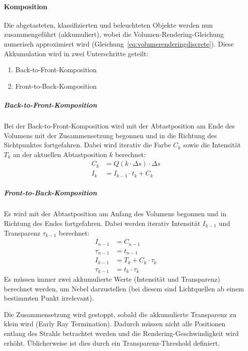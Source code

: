 				\paragraph{Komposition}
					Die abgetasteten, klassifizierten und beleuchteten Objekte werden nun zusammengeführt (akkumuliert), wobei die Volumen-Rendering-Gleichung numerisch approximiert wird (Gleichung~\eqref{eq:volumerenderingdiscrete}). Diese Akkumulation wird in zwei Unterschritte geteilt:
					\begin{enumerate}
						\item Back-to-Front-Komposition
						\item Front-to-Back-Komposition
					\end{enumerate}

					\subparagraph{Back-to-Front-Komposition}
						Bei der Back-to-Front-Komposition wird mit der Abtastposition am Ende des Volumens mit der Zusammensetzung begonnen und in die Richtung des Sichtpunktes fortgefahren. Dabei wird iterativ die Farbe \( C_k \) sowie die Intensität \( T_k \) an der aktuellen Abtastposition \( k \) berechnet:
						\begin{align*}
							C_k & = Q(k \cdot \Delta s) \cdot \Delta s \\
							I_k & = I_{k - 1} \cdot t_k + C_k
						\end{align*}

					\subparagraph{Front-to-Back-Komposition}
						Es wird mit der Abtastposition am Anfang des Volumens begonnen und in Richtung des Endes fortgefahren. Dabei werden iterativ Intensität \( I_{k - 1} \) und Transparenz \( \tau_{k - 1} \) berechnet:
						\begin{align*}
							I_{n - 1}    & = C_{n - 1}              \\
							\tau_{n - 1} & = t_{n - 1}              \\
							I_{k - 1}    & = T_k + C_k \cdot \tau_k \\
							\tau_{k - 1} & = t_k \cdot \tau_k
						\end{align*}
						Es müssen immer zwei akkumulierte Werte (Intensität und Transparenz) berechnet werden, um \zB Nebel darzustellen (bei diesem sind Lichtquellen ab einem bestimmten Punkt irrelevant).

						Die Zusammensetzung wird gestoppt, sobald die akkumulierte Transparenz zu klein wird (Early Ray Termination). Dadurch müssen nicht alle Positionen entlang des Strahls betrachtet werden und die Rendering-Geschwindigkeit wird erhöht. Üblicherweise ist dies durch ein Transparenz-Threshold definiert.

